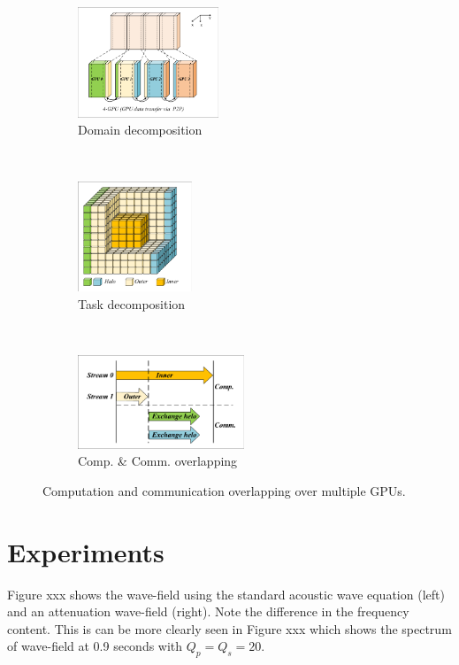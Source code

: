 \documentclass{paris17}
\begin{document}
\begin{figure}[h]
    \centering
    \begin{subfigure}[b]{0.3\textwidth}
        \centering
        \includegraphics[height=1.3in]{./fig/domain-decompose.pdf}
        \caption{Domain decomposition}
        \label{fig:domain-decomposition}
    \end{subfigure}%
    ~
    \begin{subfigure}[b]{0.3\textwidth}
        \centering
        \includegraphics[height=1.3in]{./fig/inner-outer.pdf}
        \caption{Task decomposition}
        \label{fig:task-decomposition}
    \end{subfigure}
    ~
    \begin{subfigure}[b]{0.3\textwidth}
        \centering
        \includegraphics[height=1.1in]{./fig/overlap.pdf}
        \caption{Comp. \& Comm. overlapping}
        \label{fig:overlap}
    \end{subfigure}
    \caption{Computation and communication overlapping over multiple GPUs.}
\end{figure}

\section{Experiments}

Figure xxx shows the wave-field using the standard acoustic wave equation (left) and an attenuation wave-field (right). Note the difference in the frequency content. This is can be more clearly seen in Figure xxx which shows the spectrum of wave-field at 0.9 seconds with $Q_p = Q_s = 20$.
\end{document}
